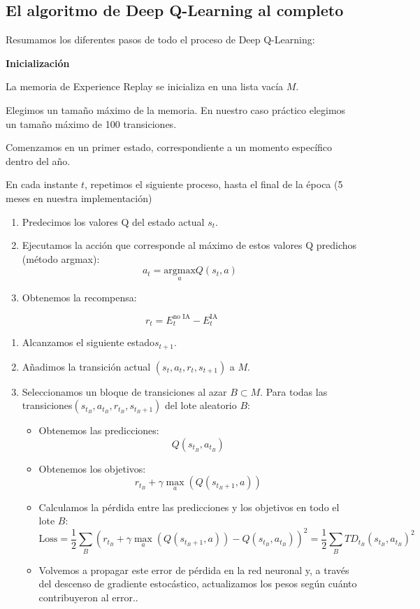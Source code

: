 \documentclass[]{book}
\providecommand{\tightlist}{%
  \setlength{\itemsep}{0pt}\setlength{\parskip}{0pt}}
\begin{document}
\hypertarget{el-algoritmo-de-deep-q-learning-al-completo}{%
\subsection{El algoritmo de Deep Q-Learning al completo}\label{el-algoritmo-de-deep-q-learning-al-completo}}

Resumamos los diferentes pasos de todo el proceso de Deep Q-Learning:

\textbf{Inicialización}

La memoria de Experience Replay se inicializa en una lista vacía \(M\).

Elegimos un tamaño máximo de la memoria. En nuestro caso práctico elegimos un tamaño máximo de 100 transiciones.

Comenzamos en un primer estado, correspondiente a un momento específico dentro del año.

En cada instante \(t\), repetimos el siguiente proceso, hasta el final de la época (5 meses en nuestra implementación)

\begin{enumerate}
\def\labelenumi{\arabic{enumi}.}
\tightlist
\item
  Predecimos los valores Q del estado actual \(s_t\).
\item
  Ejecutamos la acción que corresponde al máximo de estos valores Q predichos (método argmax):
  \[a_t = \underset{a}{\textrm{argmax}} Q(s_t, a)\]
\item
  Obtenemos la recompensa:
\end{enumerate}

\[r_t = E_t^{\textrm{no IA}} - E_t^{\textrm{IA}}\]

\begin{enumerate}
\def\labelenumi{\arabic{enumi}.}
\setcounter{enumi}{3}
\item
  Alcanzamos el siguiente estado\(s_{t+1}\).
\item
  Añadimos la transición actual \((s_t, a_t, r_t, s_{t+1})\) a \(M\).
\item
  Seleccionamos un bloque de transiciones al azar \(B \subset M\). Para todas las transiciones\((s_{t_B}, a_{t_B}, r_{t_B}, s_{t_B+1})\) del lote aleatorio \(B\):

  \begin{itemize}
  \tightlist
  \item
    Obtenemos las predicciones: \[Q(s_{t_B}, a_{t_B})\]
  \item
    Obtenemos los objetivos: \[r_{t_B} + \gamma \underset{a}{\max}(Q(s_{t_B+1}, a))\]
  \item
    Calculamos la pérdida entre las predicciones y los objetivos en todo el lote \(B\): \[\textrm{Loss} = \frac{1}{2} \sum_B \left( r_{t_B} + \gamma \underset{a}{\max}(Q(s_{t_B+1}, a)) - Q(s_{t_B}, a_{t_B}) \right)^2 = \frac{1}{2} \sum_B TD_{t_B}(s_{t_B}, a_{t_B})^2\]
  \item
    Volvemos a propagar este error de pérdida en la red neuronal y, a través del descenso de gradiente estocástico, actualizamos los pesos según cuánto contribuyeron al error..
  \end{itemize}
\end{enumerate}
\end{document}
